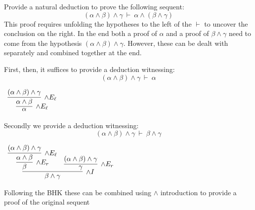 \documentclass{book}
\begin{document}
        \begin{eg}
    
            Provide a natural deduction to prove the following sequent: $$(\alpha \land \beta) \land \gamma \ \vdash \ \alpha \land (\beta \land \gamma) $$
            This proof requires unfolding the hypotheses to the left of the $\vdash$ to uncover the conclusion on the right. In the end both a proof of $\alpha$ and a proof of $\beta \land \gamma$ need to come from the hypothesis $(\alpha \land \beta) \land \gamma$. However, these can be dealt with separately and combined together at the end. 
    
            First, then, it suffices to provide a deduction witnessing: $$(\alpha \land \beta) \land \gamma \ \vdash \ \alpha$$
    
            \begin{center}
                $\begin{array}{c}
                    \infer[\land E_{\ell}]{\alpha}
                        {\infer[\land E_{\ell}]{\alpha \land \beta}
                            {(\alpha \land \beta) \land \gamma}}
                \end{array}$
            \end{center}
    
            Secondly we provide a deduction witnessing: $$(\alpha \land \beta) \land \gamma \ \vdash \ \beta \land \gamma$$
    
            \begin{center}
                $\begin{array}{c}
                    \infer[\land I]{\beta \land \gamma}
                        {\infer[\land E_{r}]{\beta} 
                            {\infer[\land E_{\ell}]{\alpha \land \beta}
                                {(\alpha \land \beta) \land \gamma}}
                        &
                        \infer[\land E_{r}]{\gamma} 
                            {(\alpha \land \beta) \land \gamma}}
                \end{array}$
            \end{center}
    
            Following the BHK these can be combined using $\land$ introduction to provide a proof of the original sequent 
    

\end{eg}
\end{document}
